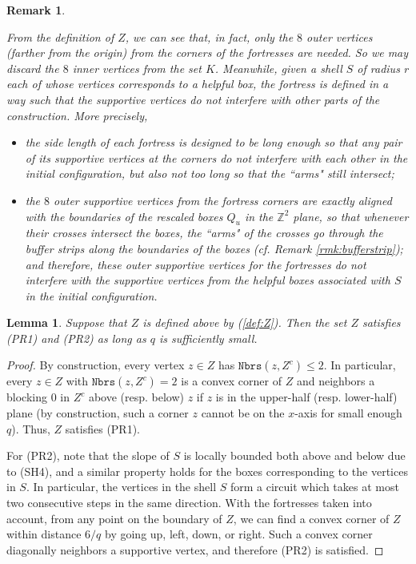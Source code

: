 \documentclass{article}
\newcommand{\bZ}{{\mathbb Z}}
\numberwithin{equation}{section}
\newtheorem{lemma}[theorem]{Lemma}
\newtheorem{remark}[theorem]{Remark}
\begin{document}
\begin{remark}\label{rmk:poscorr} {\rm
    From the definition of $Z$, we can see that, in fact, only the $8$ outer vertices (farther from the origin) from the corners of the fortresses are needed. 
    So we may discard the $8$ inner vertices from the set $K$.
    Meanwhile, given a shell $S$ of radius $r$ each of whose vertices corresponds to a helpful box, the fortress is defined in a way such that the supportive vertices do not interfere with other parts of the construction. 
    More precisely,
    \begin{itemize}
        \item 
        the side length of each fortress is designed to be long enough so that any pair of its supportive vertices at the corners do not interfere with each other in the initial configuration, but also not too long so that the ``arms" still intersect;
        
        \item 
        the $8$ outer supportive vertices from the fortress corners are exactly aligned with the boundaries of the rescaled boxes $Q_u$ in the $\bZ^2$ plane, so that whenever their crosses intersect the boxes, the ``arms" of the crosses go through the buffer strips along the boundaries of the boxes (cf. Remark \ref{rmk:bufferstrip});
        and therefore, these outer supportive vertices for the fortresses do not interfere with the supportive vertices from the helpful boxes associated with $S$ in the initial configuration. 
    \end{itemize}
    }
\end{remark}

\begin{lemma}\label{lem:PR1PR2}
    Suppose that $Z$ is defined above by (\ref{def:Z}).
    Then the set $Z$ satisfies (PR1) and (PR2) as long as $q$ is sufficiently small.
\end{lemma}
\begin{proof}
    By construction, every vertex $z \in Z$ has $\texttt{Nbrs}(z, Z^c) \leq 2$.
    In particular, every $z \in Z$ with $\texttt{Nbrs}(z, Z^c) = 2$ is a convex corner of $Z$ and neighbors a blocking $0$ in $Z^c$ above (resp. below) $z$ if $z$ is in the upper-half (resp. lower-half) plane (by construction, such a corner $z$ cannot be on the $x$-axis for small enough $q$).  
    Thus, $Z$ satisfies (PR1).

    For (PR2), note that the slope of $S$ is locally bounded both above and below due to (SH4), and a similar property holds for the boxes corresponding to the vertices in $S$.
    In particular, the vertices in the shell $S$ form a circuit which takes at most two consecutive steps in the same direction.
    With the fortresses taken into account, from any point on the boundary of $Z$, we can find a convex corner of $Z$ within distance $6/q$ by going up, left, down, or right.
    Such a convex corner diagonally neighbors a supportive vertex, and therefore (PR2) is satisfied. 
\end{proof}
 
\end{document}
